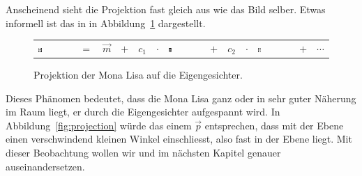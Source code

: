 Anscheinend sieht die Projektion fast gleich aus wie das Bild selber.
Etwas informell ist das in in Abbildung~\ref{fig:eigen_basis} dargestellt.
\begin{figure}[ht]
	\centering
	\begin{tabular}{m{1.8cm} c c c c c m{2cm} c c c m{2cm} c c}
		\includegraphics[width=0.1\textwidth]{images/eigenfaces/mona_lisa_eigen_approx} &
		$=$ & $\vec m$ & $+$ & $c_1$ & $\cdot$ & \includegraphics[width=0.1\textwidth]{images/eigenfaces/eigenface00}
		& $+$ & $c_2$ & $\cdot$ & \includegraphics[width=0.1\textwidth]{images/eigenfaces/eigenface01} & $+$ & $\cdots$
	\end{tabular}
	\caption{Projektion der Mona Lisa auf die Eigengesichter.}
	\label{fig:eigen_basis}
\end{figure}
Dieses Phänomen bedeutet, dass die Mona Lisa ganz oder in sehr guter Näherung im Raum liegt, er durch die Eigengesichter aufgespannt wird.
In Abbildung~\ref{fig:projection} würde das einem $\vec p$ entsprechen, dass mit der Ebene einen verschwindend kleinen Winkel einschliesst, also fast in der Ebene liegt.
Mit dieser Beobachtung wollen wir und im nächsten Kapitel genauer auseinandersetzen.
